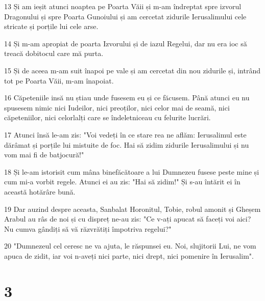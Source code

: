 \par 13 Și am ieșit atunci noaptea pe Poarta Văii și m-am îndreptat spre izvorul Dragonului și spre Poarta Gunoiului și am cercetat zidurile Ierusalimului cele stricate și porțile lui cele arse.
\par 14 Și m-am apropiat de poarta Izvorului și de iazul Regelui, dar nu era ioc să treacă dobitocul care mă purta.
\par 15 Și de aceea m-am suit înapoi pe vale și am cercetat din nou zidurile și, intrând tot pe Poarta Văii, m-am înapoiat.
\par 16 Căpeteniile insă nu știau unde fusesem eu și ce făcusem. Până atunci eu nu spusesem nimic nici Iudeilor, nici preoților, nici celor mai de seamă, nici căpeteniilor, nici celorlalți care se îndeletniceau cu felurite lucrări.
\par 17 Atunci însă le-am zis: "Voi vedeți în ce stare rea ne aflăm: Ierusalimul este dărâmat și porțile lui mistuite de foc. Hai să zidim zidurile Ierusalimului și nu vom mai fi de batjocură!"
\par 18 Și le-am istorisit cum mâna binefăcătoare a lui Dumnezeu fusese peste mine și cum mi-a vorbit regele. Atunci ei au zis: "Hai să zidim!" Și s-au întărit ei în această hotărâre bună.
\par 19 Dar auzind despre aceasta, Sanbalat Horonitul, Tobie, robul amonit și Gheșem Arabul au râs de noi și cu dispreț ne-au zis: "Ce v-ați apucat să faceți voi aici? Nu cumva gândiți să vă răzvrătiți împotriva regelui?"
\par 20 "Dumnezeul cel ceresc ne va ajuta, le răspunsei eu. Noi, slujitorii Lui, ne vom apuca de zidit, iar voi n-aveți nici parte, nici drept, nici pomenire în Ierusalim".

\chapter{3}

